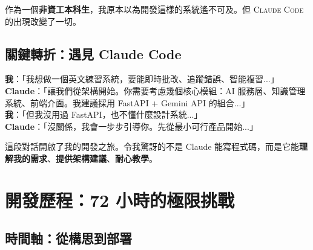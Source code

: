 \documentclass[11pt,a4paper]{article}
\newcommand{\Claude}{\textsc{Claude Code}}
\begin{document}
作為一個\textbf{非資工本科生}，我原本以為開發這樣的系統遙不可及。但 \Claude{} 的出現改變了一切。

\subsection{關鍵轉折：遇見 Claude Code}

\begin{dialogue}
\textbf{我}：「我想做一個英文練習系統，要能即時批改、追蹤錯誤、智能複習...」\\
\textbf{Claude}：「讓我們從架構開始。你需要考慮幾個核心模組：AI 服務層、知識管理系統、前端介面。我建議採用 FastAPI + Gemini API 的組合...」\\
\textbf{我}：「但我沒用過 FastAPI，也不懂什麼設計系統...」\\
\textbf{Claude}：「沒關係，我會一步步引導你。先從最小可行產品開始...」
\end{dialogue}

這段對話開啟了我的開發之旅。令我驚訝的不是 Claude 能寫程式碼，而是它能\textbf{理解我的需求}、\textbf{提供架構建議}、\textbf{耐心教學}。

\section{開發歷程：72 小時的極限挑戰}

\subsection{時間軸：從構思到部署}
\end{document}
